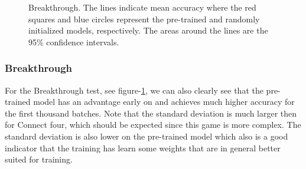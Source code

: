 \documentclass[twocolumn, letterpaper, 10 pt, conference]{ieeeconf}  %
\newcommand{\errorband}[5][]{ %
\pgfplotstableread[col sep=comma, skip first n=2]{#2}\datatable
    \addplot [draw=none, stack plots=y, forget plot] table [
        x={#3},
        y expr=\thisrow{#4}-2*\thisrow{#5}
    ] {\datatable};

    \addplot[draw=none, fill=gray!40, stack plots=y, area legend, #1] table [
        x={#3},
        y expr=4*\thisrow{#5}
    ] {\datatable} \closedcycle;

    \addplot [forget plot, stack plots=y,draw=none] table [x={#3}, y expr=-(\thisrow{#4}+2*\thisrow{#5})] {\datatable};
}
\begin{document}
\begin{figure}[H]
    \caption{Breakthrough. The lines indicate mean accuracy where the red squares and blue circles represent the pre-trained and randomly initialized models, respectively. The areas around the lines are the 95\% confidence intervals.}
    \label{plot:breakthrough}
\end{figure}

\subsubsection{Breakthrough}
For the Breakthrough test, see figure-\ref{plot:breakthrough}, we can also clearly see that the pre-trained model has an advantage early on and achieves much higher accuracy for the first thousand batches. Note that the standard deviation is much larger then for Connect four, which should be expected since this game is more complex. The standard deviation is also lower on the pre-trained model which also is a good indicator that the training has learn some weights that are in general better suited for training. 
\end{document}
